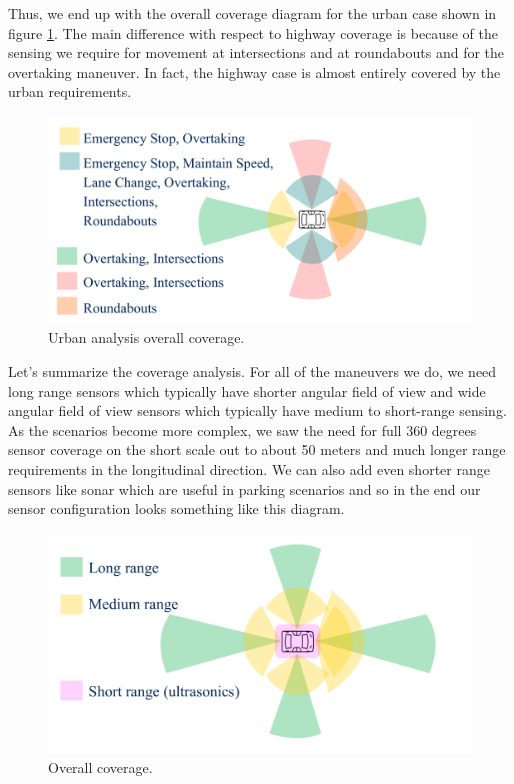 Thus, we end up with the overall coverage diagram for the urban case shown in figure \ref{urban_analysis_overall_coverage}. 
The main difference with respect to highway coverage is because of the sensing we require 
for movement at intersections and at roundabouts and for the overtaking maneuver. 
In fact, the highway case is almost entirely covered by the urban requirements. 


\begin{figure}[!htb]
\begin{center}
\includegraphics[scale=0.280]{img/hardware/urban_analysis_overall_coverage.jpeg}
\end{center}
\caption{Urban analysis overall coverage.}
\label{urban_analysis_overall_coverage}
\end{figure}


Let's summarize the coverage analysis. For all of the maneuvers we do, we need long range sensors which typically 
have shorter angular field of view and wide angular field of view sensors which typically have medium to short-range sensing. 
As the scenarios become more complex, we saw the need for full 360 degrees sensor coverage on the short scale out to 
about 50 meters and much longer range requirements in the longitudinal direction. 
We can also add even shorter range sensors like sonar which are useful in parking scenarios and so in the end our sensor configuration looks something like this diagram. 


\begin{figure}[!htb]
\begin{center}
\includegraphics[scale=0.280]{img/hardware/overall_coverage.jpeg}
\end{center}
\caption{Overall coverage.}
\label{overall_coverage}
\end{figure}


